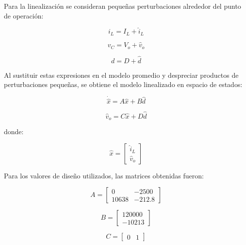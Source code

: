 \documentclass[conference]{IEEEtran}
\begin{document}
Para la linealización se consideran pequeñas perturbaciones alrededor del punto de operación:

\begin{equation}
    i_L = I_L + \hat{i}_L
\end{equation}

\begin{equation}
    v_C = V_o + \hat{v}_o
\end{equation}

\begin{equation}
    d = D + \hat{d}
\end{equation}

Al sustituir estas expresiones en el modelo promedio y despreciar productos de perturbaciones pequeñas, se obtiene el modelo linealizado en espacio de estados:

\begin{equation}
    \dot{\hat{x}} = A\hat{x} + B\hat{d}
\end{equation}

\begin{equation}
    \hat{v}_o = C\hat{x} + D\hat{d}
\end{equation}

donde:

\begin{equation}
    \hat{x} =
    \begin{bmatrix}
        \hat{i}_L \\
        \hat{v}_o
    \end{bmatrix}
\end{equation}

Para los valores de diseño utilizados, las matrices obtenidas fueron:

\begin{equation}
A =
\begin{bmatrix}
0 & -2500 \\
10638 & -212.8
\end{bmatrix}
\end{equation}

\begin{equation}
B =
\begin{bmatrix}
120000 \\
-10213
\end{bmatrix}
\end{equation}

\begin{equation}
C =
\begin{bmatrix}
0 & 1
\end{bmatrix}
\end{equation}
\end{document}
